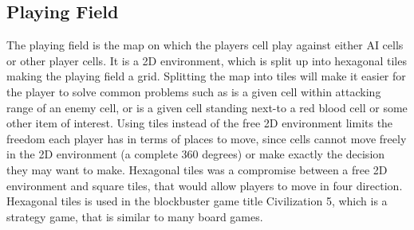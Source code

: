 \subsection{Playing Field}
\label{subsec:playingfield}
The playing field is the map on which the players cell play against either AI cells or other player cells.
It is a 2D environment, which is split up into hexagonal tiles making the playing field a grid.
Splitting the map into tiles will make it easier for the player to solve common problems such as is a given cell within attacking range of an enemy cell, or is a given cell standing next-to a red blood cell or some other item of interest.
Using tiles instead of the free 2D environment limits the freedom each player has in terms of places to move, since cells cannot move freely in the 2D environment (a complete 360 degrees) or make exactly the decision they may want to make. 
Hexagonal tiles was a compromise between a free 2D environment and square tiles, that would allow players to move in four direction.
Hexagonal tiles is used in the blockbuster game title Civilization 5, which is a strategy game, that is similar to many board games.